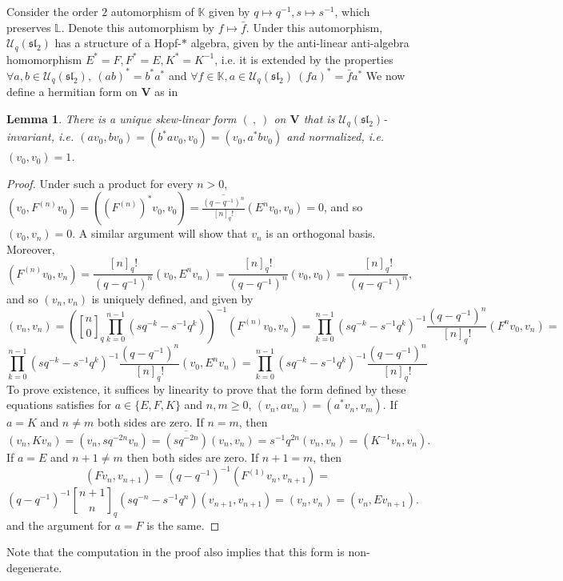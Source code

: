 \documentclass[letterpaper]{amsart}
\newtheorem{lemma}[theorem]{Lemma}
\begin{document}
Consider the order $2$ automorphism of $\mathbb{K}$ given by $q \mapsto q^{-1}, s\mapsto s^{-1}$, which preserves $\mathbb{L}$. Denote this automorphism by $f \mapsto \bar{f}$. Under this automorphism, $\mathcal{U}_q(\mathfrak{sl}_2)$ has a structure of a Hopf-$\ast$ algebra, given by the anti-linear anti-algebra homomorphism $E^\ast = F, F^\ast = E, K^\ast = K^{-1}$, i.e. it is extended by the properties $\forall a,b \in \mathcal{U}_q(\mathfrak{sl}_2),\ (ab)^\ast=b^\ast a^\ast$ and $\forall f \in \mathbb{K}, a \in \mathcal{U}_q(\mathfrak{sl}_2)\ (fa)^\ast = \bar{f}a^\ast$
We now define a hermitian form on $\textbf{V}$ as in \cite[Lemma 2.2]{wenzl1998C}
\begin{lemma}
    There is a unique skew-linear form $(\ ,\ )$ on $\textbf{V}$ that is $\mathcal{U}_q(\mathfrak{sl}_2)$-invariant, i.e. $(av_0,bv_0)=(b^\ast av_0, v_0) = (v_0, a^\ast b v_0)$ and normalized, i.e. $(v_0, v_0) = 1$.
\end{lemma}
\begin{proof}
    Under such a product for every $n > 0$, $(v_0, F^{(n)}v_0) = ((F^{(n)})^\ast v_0,v_0)=\overline{\frac{(q-q^{-1})^n}{[n]_q!}}(E^nv_0, v_0) = 0$, and so $(v_0, v_n) = 0$. A similar argument will show that $v_n$ is an orthogonal basis. Moreover,
    $$(F^{(n)}v_0, v_n) = \frac{[n]_q!}{(q-q^{-1})^n}(v_0, E^nv_n) = \frac{[n]_q!}{(q-q^{-1})^n} (v_0, v_0) = \frac{[n]_q!}{(q-q^{-1})^n},$$and so $(v_n, v_n)$ is uniquely defined, and given by
    $$(v_n, v_n) = ({n \brack 0}_q \prod_{k=0}^{n-1} (sq^{-k} - s^{-1}q^{k}))^{-1} (F^{(n)}v_0, v_n) = \prod_{k=0}^{n-1} (sq^{-k} - s^{-1}q^{k})^{-1} \frac{(q-q^{-1})^n}{[n]_q!}(F^nv_0, v_n) = $$
    $$\prod_{k=0}^{n-1} (sq^{-k} - s^{-1}q^{k})^{-1} \frac{(q-q^{-1})^n}{[n]_q!} (v_0, E^n v_n) = \prod_{k=0}^{n-1} (sq^{-k} - s^{-1}q^{k})^{-1} \frac{(q-q^{-1})^n}{[n]_q!}$$
    To prove existence, it suffices by linearity to prove that the form defined by these equations satisfies for $a \in \{E, F, K\}$ and $n, m\geq 0$, $(v_n, av_m) = (a^\ast v_n, v_m)$.
    If $a=K$ and $n\neq m$ both sides are zero. If $n = m$, then $$(v_n, Kv_n) = (v_n, sq^{-2n}v_n) = \overline{(sq^{-2n})}(v_n, v_n) = s^{-1}q^{2n}(v_n, v_n) = (K^{-1}v_n, v_n).$$If $a = E$ and $n + 1 \neq m$ then both sides are zero. If $n + 1 = m$, then
    $$(Fv_n, v_{n+1}) = (q-q^{-1})^{-1}(F^{(1)}v_n, v_{n+1}) = $$
    $$(q-q^{-1})^{-1}{n + 1 \brack n}_q (sq^{-n} - s^{-1}q^n) (v_{n+1}, v_{n+1}) = (v_n, v_n) = (v_n, Ev_{n+1}).$$and the argument for $a = F$ is the same.
\end{proof}
Note that the computation in the proof also implies that this form is non-degenerate.
\end{document}
